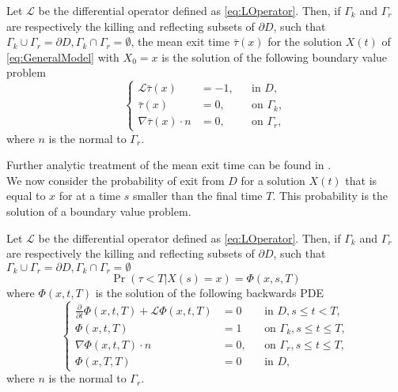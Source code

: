 \begin{theorem} Let $\mathcal L$ be the differential operator defined as \eqref{eq:LOperator}. Then, if $\Gamma_k$ and $\Gamma_r$ are respectively the killing and reflecting subsets of $\partial D$, such that $\Gamma_k \cup \Gamma_r = \partial D, \Gamma_k \cap \Gamma_r = \emptyset$, the mean exit time $\bar \tau(x)$ for the solution $X(t)$ of \eqref{eq:GeneralModel} with $X_0 = x$ is the solution of the following boundary value problem
\begin{equation}\label{eq:PDETau}
\left \{
\begin{aligned}
	\mathcal L \bar \tau(x) &= -1, && \text{in } D, \\
	\bar\tau(x) &= 0, && \text{on } \Gamma_k, \\
	\nabla \bar\tau(x) \cdot n &= 0, && \text{on } \Gamma_r,
\end{aligned} \right .
\end{equation}
where $n$ is the normal to $\Gamma_r$.
\end{theorem}
\noindent Further analytic treatment of the mean exit time can be found in \cite{Krumscheid2015,Pavliotis2014}. \\
We now consider the probability of exit from $D$ for a solution $X(t)$ that is equal to $x$ for at a time $s$ smaller than the final time $T$. This probability is the solution of a boundary value problem.
\begin{theorem} Let $\mathcal L$ be the differential operator defined as \eqref{eq:LOperator}. Then, if $\Gamma_k$ and $\Gamma_r$ are respectively the killing and reflecting subsets of $\partial D$, such that $\Gamma_k \cup \Gamma_r = \partial D, \Gamma_k \cap \Gamma_r = \emptyset$
\begin{equation}\label{eq:ExitProbNotation}
	\Pr(\tau < T | X(s) = x) = \Phi(x,s,T) 
\end{equation}
where $\Phi(x,t,T)$ is the solution of the following backwards PDE
\begin{equation}\label{eq:PDEPhi}
\left \{
\begin{aligned}
	\frac{\partial}{\partial t} \Phi(x,t,T) + \mathcal L \Phi(x,t,T) &= 0 && \text{in } D, s \leq t < T, \\
	\Phi(x,t,T) &= 1 && \text{on } \Gamma_k, s \leq t \leq T,\\
	\nabla \Phi(x,t,T) \cdot n &= 0, && \text{on } \Gamma_r, s \leq t \leq T, \\
	\Phi(x,T,T) &= 0 && \text{in } D,
\end{aligned} \right .
\end{equation}
where $n$ is the normal to $\Gamma_r$.
\end{theorem}
